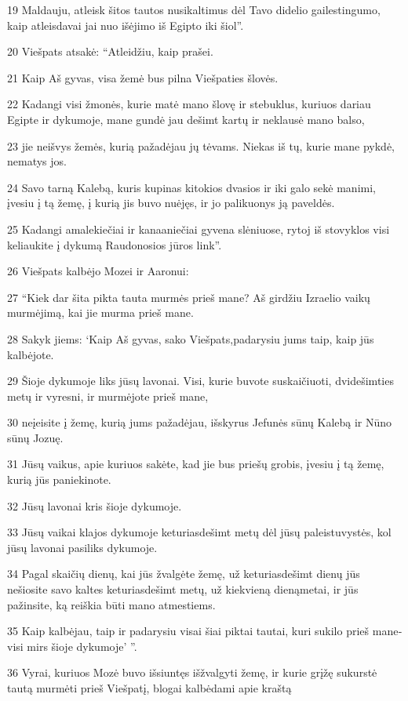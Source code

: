 \par 19 Maldauju, atleisk šitos tautos nusikaltimus dėl Tavo didelio gailestingumo, kaip atleisdavai jai nuo išėjimo iš Egipto iki šiol”. 
\par 20 Viešpats atsakė: “Atleidžiu, kaip prašei. 
\par 21 Kaip Aš gyvas, visa žemė bus pilna Viešpaties šlovės. 
\par 22 Kadangi visi žmonės, kurie matė mano šlovę ir stebuklus, kuriuos dariau Egipte ir dykumoje, mane gundė jau dešimt kartų ir neklausė mano balso, 
\par 23 jie neišvys žemės, kurią pažadėjau jų tėvams. Niekas iš tų, kurie mane pykdė, nematys jos. 
\par 24 Savo tarną Kalebą, kuris kupinas kitokios dvasios ir iki galo sekė manimi, įvesiu į tą žemę, į kurią jis buvo nuėjęs, ir jo palikuonys ją paveldės. 
\par 25 Kadangi amalekiečiai ir kanaaniečiai gyvena slėniuose, rytoj iš stovyklos visi keliaukite į dykumą Raudonosios jūros link”. 
\par 26 Viešpats kalbėjo Mozei ir Aaronui: 
\par 27 “Kiek dar šita pikta tauta murmės prieš mane? Aš girdžiu Izraelio vaikų murmėjimą, kai jie murma prieš mane. 
\par 28 Sakyk jiems: ‘Kaip Aš gyvas,­ sako Viešpats,­padarysiu jums taip, kaip jūs kalbėjote. 
\par 29 Šioje dykumoje liks jūsų lavonai. Visi, kurie buvote suskaičiuoti, dvidešimties metų ir vyresni, ir murmėjote prieš mane, 
\par 30 neįeisite į žemę, kurią jums pažadėjau, išskyrus Jefunės sūnų Kalebą ir Nūno sūnų Jozuę. 
\par 31 Jūsų vaikus, apie kuriuos sakėte, kad jie bus priešų grobis, įvesiu į tą žemę, kurią jūs paniekinote. 
\par 32 Jūsų lavonai kris šioje dykumoje. 
\par 33 Jūsų vaikai klajos dykumoje keturiasdešimt metų dėl jūsų paleistuvystės, kol jūsų lavonai pasiliks dykumoje. 
\par 34 Pagal skaičių dienų, kai jūs žvalgėte žemę, už keturiasdešimt dienų jūs nešiosite savo kaltes keturiasdešimt metų, už kiekvieną dieną­metai, ir jūs pažinsite, ką reiškia būti mano atmestiems. 
\par 35 Kaip kalbėjau, taip ir padarysiu visai šiai piktai tautai, kuri sukilo prieš mane­visi mirs šioje dykumoje’ ”. 
\par 36 Vyrai, kuriuos Mozė buvo išsiuntęs išžvalgyti žemę, ir kurie grįžę sukurstė tautą murmėti prieš Viešpatį, blogai kalbėdami apie kraštą 
